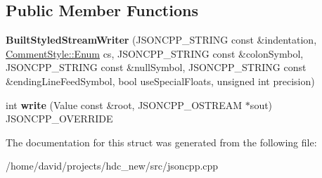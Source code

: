 \subsection*{Public Member Functions}
\begin{DoxyCompactItemize}
\item 
{\bfseries Built\+Styled\+Stream\+Writer} (J\+S\+O\+N\+C\+P\+P\+\_\+\+S\+T\+R\+I\+NG const \&indentation, \hyperlink{struct_json_1_1_comment_style_a51fc08f3518fd81eba12f340d19a3d0c}{Comment\+Style\+::\+Enum} cs, J\+S\+O\+N\+C\+P\+P\+\_\+\+S\+T\+R\+I\+NG const \&colon\+Symbol, J\+S\+O\+N\+C\+P\+P\+\_\+\+S\+T\+R\+I\+NG const \&null\+Symbol, J\+S\+O\+N\+C\+P\+P\+\_\+\+S\+T\+R\+I\+NG const \&ending\+Line\+Feed\+Symbol, bool use\+Special\+Floats, unsigned int precision)\hypertarget{struct_json_1_1_built_styled_stream_writer_adf11b7d1ee3c68d096b7c662ee85948e}{}\label{struct_json_1_1_built_styled_stream_writer_adf11b7d1ee3c68d096b7c662ee85948e}

\item 
int {\bfseries write} (Value const \&root, J\+S\+O\+N\+C\+P\+P\+\_\+\+O\+S\+T\+R\+E\+AM $\ast$sout) J\+S\+O\+N\+C\+P\+P\+\_\+\+O\+V\+E\+R\+R\+I\+DE\hypertarget{struct_json_1_1_built_styled_stream_writer_a823cdb1afabb6b0d5f39bcd5a6a6f747}{}\label{struct_json_1_1_built_styled_stream_writer_a823cdb1afabb6b0d5f39bcd5a6a6f747}

\end{DoxyCompactItemize}


The documentation for this struct was generated from the following file\+:\begin{DoxyCompactItemize}
\item 
/home/david/projects/hdc\+\_\+new/src/jsoncpp.\+cpp\end{DoxyCompactItemize}
